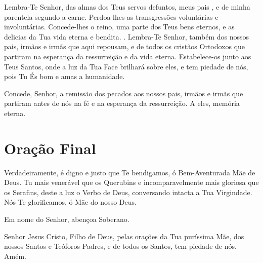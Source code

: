 \documentclass{subfiles}
\begin{document}
Lembra-Te Senhor, das almas dos Teus servos defuntos, meus pais \names, e de
minha parentela segundo a carne. Perdoa-lhes as transgressões voluntárias e
involuntárias. Concede-lhes o reino, uma parte dos Teus bens eternos, e as
delicias da Tua vida eterna e bendita. \metanoia{}. Lembra-Te Senhor,
também dos nossos pais, irmãos e irmãs que aqui repousam, e de todos os cristãos
Ortodoxos que partiram na esperança da ressurreição e da vida eterna.
Estabelece-os junto aos Teus Santos, onde a luz da Tua Face brilhará sobre eles,
e tem piedade de nós, pois Tu És bom e amas a humanidade. \metanoia{}

Concede, Senhor, a remissão dos pecados aos nossos pais, irmãos e irmãs que
partiram antes de nós na fé e na esperança da ressurreição. A eles, memória
eterna. \metanoia{}

\section*{Oração Final}

Verdadeiramente, é digno e justo que Te bendigamos, ó Bem-Aventurada Mãe de
Deus. Tu mais venerável que os Querubins e incomparavelmente mais gloriosa que
os Serafins, deste a luz o Verbo de Deus, conversando intacta a Tua Virgindade.
Nós Te glorificamos, ó Mãe do nosso Deus.

\Doxology{}

\mercy{} \thrice{}

Em nome do Senhor, abençoa Soberano.

Senhor Jesus Cristo, Filho de Deus, pelas orações da Tua puríssima Mãe, dos
nossos Santos e Teóforos Padres, e de todos os Santos, tem piedade de nós. Amém.
\end{document}
